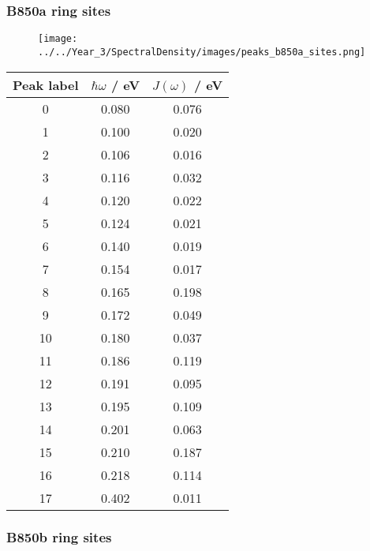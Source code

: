 \afterpartskip
\subsubsection{B850a ring sites}
\label{subsubsec:specdens_b850a}

\begin{figure}
    \centering
    \texttt{[image: ../../Year\_3/SpectralDensity/images/peaks\_b850a\_sites.png]}
\end{figure}

\begin{table}
    \centering
    \begin{tabular}{||c c c||}
    \hline
    Peak label & $\hbar \omega$ / eV & $J\left(\omega\right)$ / eV \\
    \hline\hline
    
     0 & 0.080 & 0.076 \\
     1 & 0.100 & 0.020 \\
     2 & 0.106 & 0.016 \\
     3 & 0.116 & 0.032 \\
     4 & 0.120 & 0.022 \\
     5 & 0.124 & 0.021 \\
     6 & 0.140 & 0.019 \\
     7 & 0.154 & 0.017 \\
     8 & 0.165 & 0.198 \\
     9 & 0.172 & 0.049 \\
     10 & 0.180 & 0.037 \\
     11 & 0.186 & 0.119 \\
     12 & 0.191 & 0.095 \\
     13 & 0.195 & 0.109 \\
     14 & 0.201 & 0.063 \\
     15 & 0.210 & 0.187 \\
     16 & 0.218 & 0.114 \\
     17 & 0.402 & 0.011 \\
    \hline 
    \end{tabular}
\end{table}


\afterpartskip
\subsubsection{B850b ring sites}
\label{subsubsec:specdens_b850b}

